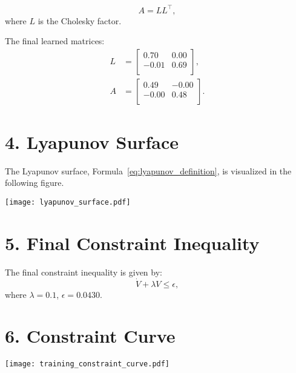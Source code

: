 \documentclass[11pt]{article}
\begin{document}
\begin{equation}
A = L L^\top,
\end{equation}
where $L$ is the Cholesky factor.

The final learned matrices:
\begin{align}
L &= \begin{bmatrix}
0.70 & 0.00 \\
-0.01 & 0.69 \\
\end{bmatrix}, \\
A &= \begin{bmatrix}
0.49 & -0.00 \\
-0.00 & 0.48 \\
\end{bmatrix}.
\end{align}

\section*{4. Lyapunov Surface}
The Lyapunov surface, Formula~\eqref{eq:lyapunov_definition}, is visualized in the following figure.
\begin{center}
\texttt{[image: lyapunov\_surface.pdf]}
\end{center}

\section*{5. Final Constraint Inequality}
The final constraint inequality is given by:
\begin{equation}
\dot{V} + \lambda V \leq \epsilon,
\end{equation}
where $\lambda = 0.1$, $\epsilon = 0.0430$.

\section*{6. Constraint Curve}
\begin{center}
\texttt{[image: training\_constraint\_curve.pdf]}
\end{center}
\end{document}
